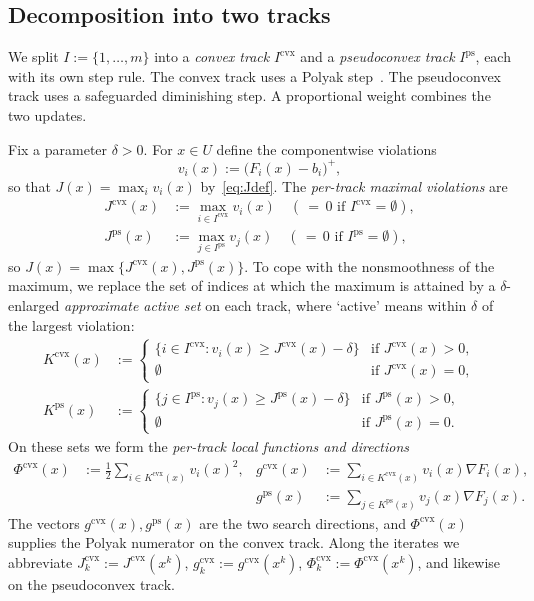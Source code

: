 \documentclass[]{interact}
\theoremstyle{plain}
\theoremstyle{definition}
\theoremstyle{remark}
\newcommand{\cvx}{\mathrm{cvx}}
\newcommand{\ps}{\mathrm{ps}}
\begin{document}
\subsection{Decomposition into two tracks}\label{ssec:dual-track}
We split $I:=\{1,\dots,m\}$ into a \emph{convex track} $I^{\cvx}$ and a \emph{pseudoconvex track} $I^{\ps}$, each with its own step rule. The convex track uses a Polyak step~\citep{polyak1969}. The pseudoconvex track uses a safeguarded diminishing step. A proportional weight combines the two updates.

Fix a parameter $\delta>0$. For $x\in U$ define the componentwise violations
\begin{equation}\label{eq:vi}
v_i(x):=\bigl(F_i(x)-b_i\bigr)^+,
\end{equation}
so that $J(x)=\max_i v_i(x)$ by~\eqref{eq:Jdef}. The \emph{per-track maximal violations} are
\begin{align}
J^{\cvx}(x)&:=\max_{i\in I^{\cvx}}v_i(x)\quad(\,{=}\,0\text{ if }I^{\cvx}=\emptyset),\label{eq:Jcvx}\\
J^{\ps}(x)&:=\max_{j\in I^{\ps}}v_j(x)\quad(\,{=}\,0\text{ if }I^{\ps}=\emptyset),\label{eq:Jps}
\end{align}
so $J(x)=\max\{J^{\cvx}(x),J^{\ps}(x)\}$. To cope with the nonsmoothness of the maximum, we replace the set of indices at which the maximum is attained by a $\delta$-enlarged \emph{approximate active set} on each track, where `active' means within $\delta$ of the largest violation:
\begin{align}
K^{\cvx}(x)&:=\begin{cases}\{i\in I^{\cvx}:v_i(x)\ge J^{\cvx}(x)-\delta\} & \text{if }J^{\cvx}(x)>0,\\ \emptyset & \text{if }J^{\cvx}(x)=0,\end{cases}\label{eq:Kcvx}\\[2pt]
K^{\ps}(x)&:=\begin{cases}\{j\in I^{\ps}:v_j(x)\ge J^{\ps}(x)-\delta\} & \text{if }J^{\ps}(x)>0,\\ \emptyset & \text{if }J^{\ps}(x)=0.\end{cases}\label{eq:Kps}
\end{align}
On these sets we form the \emph{per-track local functions and directions}
\begin{align}
\Phi^{\cvx}(x)&:=\tfrac12\!\!\sum_{i\in K^{\cvx}(x)}\!\! v_i(x)^2, & g^{\cvx}(x)&:=\!\!\sum_{i\in K^{\cvx}(x)}\!\! v_i(x)\nabla F_i(x),\label{eq:phi-g-cvx}\\
& & g^{\ps}(x)&:=\!\!\sum_{j\in K^{\ps}(x)}\!\! v_j(x)\nabla F_j(x).\label{eq:phi-g-ps}
\end{align}
The vectors $g^{\cvx}(x),g^{\ps}(x)$ are the two search directions, and $\Phi^{\cvx}(x)$ supplies the Polyak numerator on the convex track. Along the iterates we abbreviate $J^{\cvx}_k:=J^{\cvx}(x^k)$, $g^{\cvx}_k:=g^{\cvx}(x^k)$, $\Phi^{\cvx}_k:=\Phi^{\cvx}(x^k)$, and likewise on the pseudoconvex track.
\end{document}
